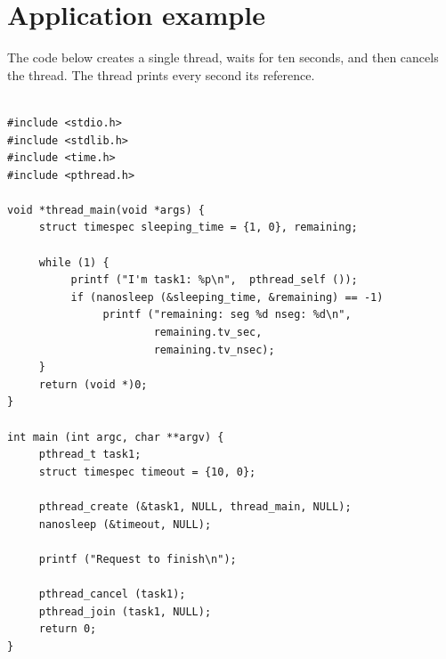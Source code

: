 \documentclass[a4paper,10pt,twoside]{report}
\begin{document}
\appendix

\chapter{Application example}\label{partikle:example}

The code below creates a single thread, waits for ten seconds, and
then cancels the thread. The thread prints every second its reference.
\begin{lstlisting}[basicstyle=\small,framexrightmargin
    =-14mm,xleftmargin=14mm,morekeywords={movl, testl, je, call}]

#include <stdio.h>
#include <stdlib.h>
#include <time.h>
#include <pthread.h>

void *thread_main(void *args) {
     struct timespec sleeping_time = {1, 0}, remaining;

     while (1) {
          printf ("I'm task1: %p\n",  pthread_self ());
          if (nanosleep (&sleeping_time, &remaining) == -1)
               printf ("remaining: seg %d nseg: %d\n", 
                       remaining.tv_sec, 
                       remaining.tv_nsec);
     }
     return (void *)0;
}

int main (int argc, char **argv) {
     pthread_t task1;
     struct timespec timeout = {10, 0};

     pthread_create (&task1, NULL, thread_main, NULL);
     nanosleep (&timeout, NULL);

     printf ("Request to finish\n");

     pthread_cancel (task1);
     pthread_join (task1, NULL);
     return 0;
}

\end{lstlisting}
\end{document}
